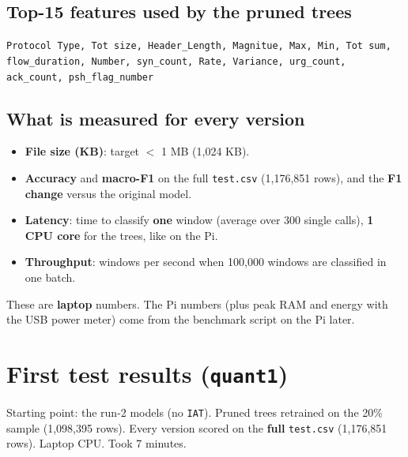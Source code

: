 \documentclass[11pt]{article}
\begin{document}
\subsection*{Top-15 features used by the pruned trees}
\texttt{Protocol Type, Tot size, Header\_Length, Magnitue, Max, Min, Tot sum, flow\_duration, Number, syn\_count, Rate, Variance, urg\_count, ack\_count,
psh\_flag\_number}

\subsection*{What is measured for every version}
\begin{itemize}
\item \textbf{File size (KB)}: target $<$ 1 MB (1,024 KB).
\item \textbf{Accuracy} and \textbf{macro-F1} on the full \texttt{test.csv} (1,176,851 rows), and the \textbf{F1 change} versus the original model.
\item \textbf{Latency}: time to classify \textbf{one} window (average over 300 single calls), \textbf{1 CPU core} for the trees, like on the Pi.
\item \textbf{Throughput}: windows per second when 100,000 windows are classified in one batch.
\end{itemize}
These are \textbf{laptop} numbers. The Pi numbers (plus peak RAM and energy with the USB power meter) come from the benchmark script on the Pi later.


\newpage
\section{First test results (\texttt{quant1})}
Starting point: the run-2 models (no \texttt{IAT}). Pruned trees retrained on the 20\% sample (1,098,395 rows).
Every version scored on the \textbf{full} \texttt{test.csv} (1,176,851 rows). Laptop CPU. Took 7 minutes.
\end{document}
